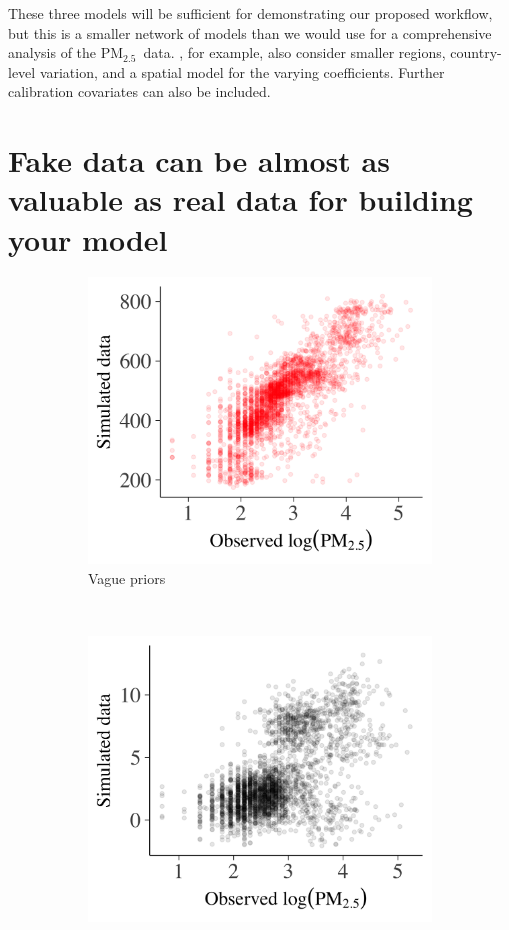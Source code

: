 \documentclass{statsoc}
\newcommand{\PM}{PM$_{2.5}$}
\begin{document}
These three models will be sufficient for demonstrating our proposed workflow,
but this is a smaller network of models than we would use for a comprehensive
analysis of the \PM\ data. \citet{shaddick2017data}, for example, also consider
smaller regions, country-level variation, and a spatial model for the varying
coefficients. Further calibration covariates can also be included.


\section{Fake data can be almost as valuable as real data for building your model}
\label{sec:prior_pred}

\begin{figure}
\centering
\begin{subfigure}{0.31\textwidth}
\includegraphics[width=\textwidth]{prior_pred_vague.png}
\caption{Vague priors}
\label{fig:prior_pred_vague}
\end{subfigure}
~
\begin{subfigure}{0.31\textwidth}
\includegraphics[width=\textwidth]{prior_pred_wip.png}

\end{subfigure}
\end{figure}
\end{document}
